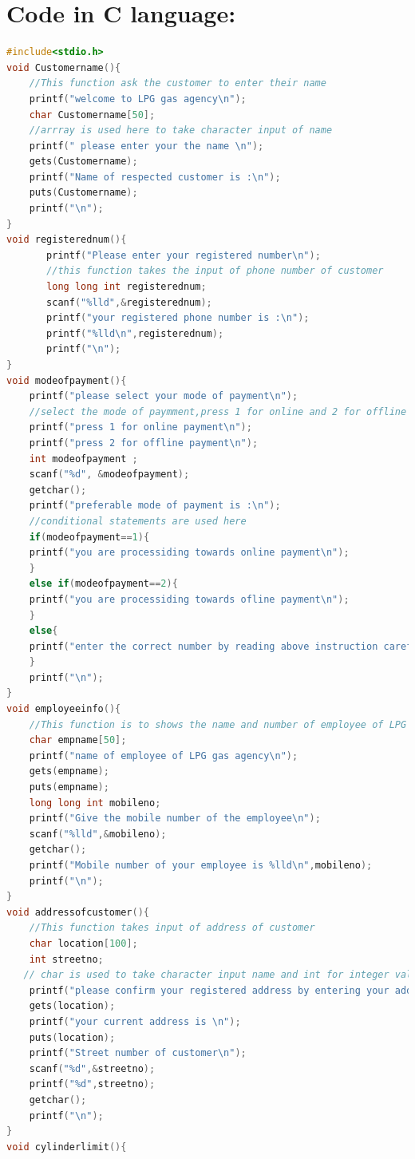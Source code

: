 \documentclass{article}
\begin{document}
\pagestyle{fancy}
\section{Code in C  language:}
\begin{lstlisting}[style=chstyle,language=C]
#include<stdio.h>
void Customername(){
	//This function ask the customer to enter their name
	printf("welcome to LPG gas agency\n");
	char Customername[50];
	//arrray is used here to take character input of name
	printf(" please enter your the name \n");
	gets(Customername);
	printf("Name of respected customer is :\n");
	puts(Customername);
	printf("\n");
}
void registerednum(){
       printf("Please enter your registered number\n");
       //this function takes the input of phone number of customer
       long long int registerednum;
       scanf("%lld",&registerednum);
       printf("your registered phone number is :\n");
       printf("%lld\n",registerednum);
       printf("\n");
}
void modeofpayment(){
	printf("please select your mode of payment\n");
	//select the mode of paymment,press 1 for online and 2 for offline paymnet
	printf("press 1 for online payment\n");
	printf("press 2 for offline payment\n");
	int modeofpayment ;
	scanf("%d", &modeofpayment);
	getchar();
	printf("preferable mode of payment is :\n");
	//conditional statements are used here
	if(modeofpayment==1){
	printf("you are processiding towards online payment\n");
	}
	else if(modeofpayment==2){
	printf("you are processiding towards ofline payment\n");
	}
	else{
	printf("enter the correct number by reading above instruction carefully\n");
	}
	printf("\n");
}
void employeeinfo(){
	//This function is to shows the name and number of employee of LPG agency
	char empname[50];
	printf("name of employee of LPG gas agency\n");
	gets(empname);
	puts(empname);
	long long int mobileno;
	printf("Give the mobile number of the employee\n");
	scanf("%lld",&mobileno);
	getchar();
	printf("Mobile number of your employee is %lld\n",mobileno);
	printf("\n");
}
void addressofcustomer(){
	//This function takes input of address of customer 
	char location[100];
	int streetno;
   // char is used to take character input name and int for integer value of street number
	printf("please confirm your registered address by entering your address\n");
	gets(location);
	printf("your current address is \n");
	puts(location);
	printf("Street number of customer\n");
	scanf("%d",&streetno);
	printf("%d",streetno);	
	getchar();
	printf("\n");
}
void cylinderlimit(){

\end{lstlisting}
\end{document}
